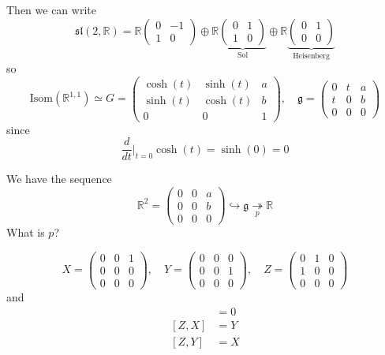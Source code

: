 \documentclass[12pt]{article}
\newcommand{\R}{\mathbb{R}}
\newcommand{\g}{\mathfrak{g}}
\newcommand{\slf}{\mathfrak{sl}}
\begin{document}
    Then we can write 
    \[\slf(2, \R) = \R\begin{pmatrix}
        0 & -1\\ 
        1 & 0
    \end{pmatrix} \oplus \R\underbrace{\begin{pmatrix}
        0 & 1\\ 
        1 & 0
    \end{pmatrix}}_{\text{Sol}} \oplus \R\underbrace{\begin{pmatrix}
        0 & 1\\ 
        0 & 0
    \end{pmatrix}}_{\text{Heisenberg}}\]
    so 
    \[\text{Isom}(\R^{1, 1}) \simeq G =\left(\begin{array}{cc|c}
        \cosh(t) & \sinh(t) & a\\
        \sinh(t) & \cosh(t) & b\\ 
        \hline
        0 & 0 & 1
    \end{array}\right), \quad \g = \left(\begin{array}{cc|c}
        0 & t & a\\ 
        t & 0 & b\\
        \hline
        0 & 0 & 0        
    \end{array}\right)\] 
    since 
    \[\frac{d}{dt}\bigg\vert_{t=0} \cosh(t) = \sinh(0) = 0\] 

    We have the sequence 
    \[\R^2 = \begin{pmatrix}
        0 & 0 & a\\ 
        0 & 0 & b\\
        0 & 0 & 0
    \end{pmatrix} \hookrightarrow \g \underset{p}{\twoheadrightarrow} \R\]
    What is $p$? 

    \[X = \begin{pmatrix}
        0 & 0 & 1\\ 
        0 & 0 & 0\\ 
        0 & 0 & 0
    \end{pmatrix}, \quad Y = \begin{pmatrix}
        0 & 0 & 0\\ 
        0 & 0 & 1\\ 
        0 & 0 & 0
    \end{pmatrix}, \quad Z = \begin{pmatrix}
        0 & 1 & 0\\ 
        1 & 0 & 0\\ 
        0 & 0 & 0
    \end{pmatrix}\]
    and 
    \begin{align*}
        [X, Y] &= 0\\ 
        [Z, X] &= Y\\ 
        [Z, Y] &= X
    \end{align*}
\end{document}
